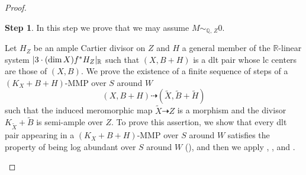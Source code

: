 \documentclass[12pt]{amsart}
\theoremstyle{definition}
\newtheorem{step3}{Step}
\begin{document}
\begin{proof}
\begin{step3}\label{step3--prop--gen-can-bundle-formula-klt-Q-div}
In this step we prove that we may assume $M \sim_{\mathbb{Q},\,Z}0$. 

Let $H_{Z}$ be an ample Cartier divisor on $Z$ and $H$ a general member of the $\mathbb{R}$-linear system $|3 \cdot ({\rm dim}\,X) f^{*}H_{Z}|_{\mathbb{R}}$ such that $(X,B+H)$ is a dlt pair whose lc centers are those  of $(X,B)$. 
We prove the existence of a finite sequence of steps of a $(K_{X}+B+H)$-MMP over $S$ around $W$%
$$(X,B+H) \dashrightarrow (\tilde{X},\tilde{B}+\tilde{H})$$
such that the induced meromorphic map $\tilde{X} \dashrightarrow Z$ is a morphism and the divisor $K_{\tilde{X}}+\tilde{B}$ is semi-ample over $Z$. 
To prove this assertion, we show that every dlt pair appearing in a $(K_{X}+B+H)$-MMP over $S$ around $W$ satisfies the property of being log abundant over $S$ around $W$ (\cite[Definition 2.23]{eh-analytic-mmp}), and then we apply \cite[Theorem 1.3]{eh-analytic-mmp}, \cite[Theorem 1.5]{fujino-analytic-lcabundance}, and \cite[Theorem 1.1]{eh-analytic-mmp-2}. 



\end{step3}
\end{proof}
\end{document}
